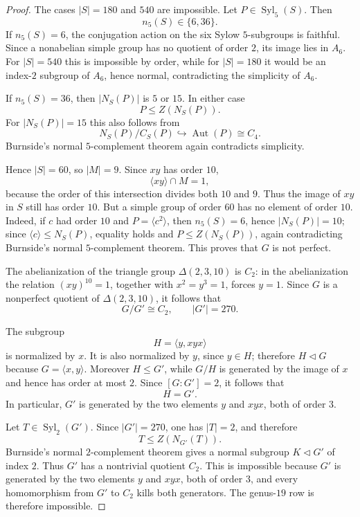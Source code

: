 \documentclass[11pt]{amsart}
\theoremstyle{remark}
\newcommand{\Aut}{\operatorname{Aut}}
\newcommand{\Syl}{\operatorname{Syl}}
\begin{document}
\begin{proof}
The cases $|S|=180$ and $540$ are impossible. Let
$P\in\Syl_5(S)$. Then
\[
n_5(S)\in\{6,36\}.
\]
If $n_5(S)=6$, the conjugation action on the six Sylow $5$-subgroups
is faithful. Since a nonabelian simple group has no quotient of order
$2$, its image lies in $A_6$. For $|S|=540$ this is impossible by
order, while for $|S|=180$ it would be an index-$2$ subgroup of $A_6$,
hence normal, contradicting the simplicity of $A_6$.

If $n_5(S)=36$, then $|N_S(P)|$ is $5$ or $15$. In either case
\[
P\le Z(N_S(P)).
\]
For $|N_S(P)|=15$ this also follows from
\[
N_S(P)/C_S(P)\hookrightarrow\Aut(P)\cong C_4.
\]
Burnside's normal $5$-complement theorem again contradicts simplicity.

Hence $|S|=60$, so $|M|=9$. Since $xy$ has order $10$,
\[
\langle xy\rangle\cap M=1,
\]
because the order of this intersection divides both $10$ and $9$.
Thus the image of $xy$ in $S$ still has order $10$. But a simple group
of order $60$ has no element of order $10$. Indeed, if $c$ had order
$10$ and $P=\langle c^2\rangle$, then $n_5(S)=6$, hence
$|N_S(P)|=10$; since $\langle c\rangle\le N_S(P)$, equality holds and
$P\le Z(N_S(P))$, again contradicting Burnside's normal
$5$-complement theorem. This proves that $G$ is not perfect.

The abelianization of the triangle group $\Delta(2,3,10)$ is $C_2$:
in the abelianization the relation $(xy)^{10}=1$, together with
$x^2=y^3=1$, forces $y=1$. Since $G$ is a nonperfect quotient of
$\Delta(2,3,10)$, it follows that
\[
G/G'\cong C_2,
\qquad
|G'|=270.
\]

The subgroup
\[
H=\langle y,xyx\rangle
\]
is normalized by $x$. It is also normalized by $y$, since $y\in H$;
therefore $H\triangleleft G$ because $G=\langle x,y\rangle$.
Moreover $H\le G'$, while $G/H$ is generated by the image of $x$
and hence has order at most $2$. Since $[G:G']=2$, it follows that
\[
H=G'.
\]
In particular, $G'$ is generated by the two elements $y$ and $xyx$,
both of order $3$.

Let $T\in\Syl_2(G')$. Since $|G'|=270$, one has $|T|=2$, and therefore
\[
T\le Z(N_{G'}(T)).
\]
Burnside's normal $2$-complement theorem gives a normal subgroup
$K\triangleleft G'$ of index $2$. Thus $G'$ has a nontrivial quotient
$C_2$. This is impossible because $G'$ is generated by the two elements
$y$ and $xyx$, both of order $3$, and every homomorphism from $G'$ to
$C_2$ kills both generators. The genus-$19$ row is therefore impossible.
\end{proof}
\end{document}
